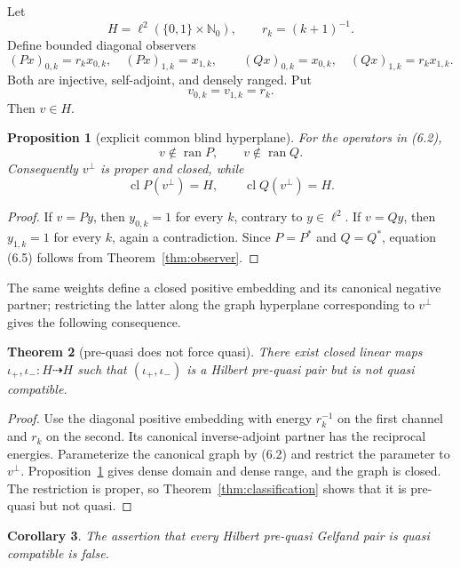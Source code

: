 \documentclass[11pt]{article}
\newtheorem{theorem}{Theorem}[section]
\newtheorem{proposition}[theorem]{Proposition}
\newtheorem{corollary}[theorem]{Corollary}
\newcommand{\N}{\mathbb N_0}
\newcommand{\ran}{\operatorname{ran}}
\newcommand{\clos}{\operatorname{cl}}
\begin{document}
Let
\[
  H=\ell^2(\{0,1\}\times\N),\qquad r_k=(k+1)^{-1}.
  \tag{6.1}
\]
Define bounded diagonal observers
\[
  (Px)_{0,k}=r_kx_{0,k},\quad (Px)_{1,k}=x_{1,k},
  \qquad
  (Qx)_{0,k}=x_{0,k},\quad (Qx)_{1,k}=r_kx_{1,k}.
  \tag{6.2}
\]
Both are injective, self-adjoint, and densely ranged.  Put
\[
  v_{0,k}=v_{1,k}=r_k.
  \tag{6.3}
\]
Then \(v\in H\).

\begin{proposition}[explicit common blind hyperplane]\label{prop:model}
For the operators in (6.2),
\[
  v\notin\ran P,\qquad v\notin\ran Q.
  \tag{6.4}
\]
Consequently \(v^\perp\) is proper and closed, while
\[
  \clos{P(v^\perp)}=H,
  \qquad
  \clos{Q(v^\perp)}=H.
  \tag{6.5}
\]
\end{proposition}

\begin{proof}
If \(v=Py\), then \(y_{0,k}=1\) for every \(k\), contrary to
\(y\in\ell^2\).  If \(v=Qy\), then \(y_{1,k}=1\) for every \(k\), again a
contradiction.  Since \(P=P^*\) and \(Q=Q^*\), equation (6.5) follows from
Theorem~\ref{thm:observer}.
\end{proof}

The same weights define a closed positive embedding and its canonical
negative partner; restricting the latter along the graph hyperplane
corresponding to \(v^\perp\) gives the following consequence.

\begin{theorem}[pre-quasi does not force quasi]\label{thm:counterexample}
There exist closed linear maps
\(\iota_+,\iota_-:H\dashrightarrow H\) such that
\((\iota_+,\iota_-)\) is a Hilbert pre-quasi pair but is not quasi compatible.
\end{theorem}

\begin{proof}
Use the diagonal positive embedding with energy \(r_k^{-1}\) on the first
channel and \(r_k\) on the second.  Its canonical inverse-adjoint partner has
the reciprocal energies.  Parameterize the canonical graph by (6.2) and
restrict the parameter to \(v^\perp\).  Proposition~\ref{prop:model} gives
dense domain and dense range, and the graph is closed.  The restriction is
proper, so Theorem~\ref{thm:classification} shows that it is pre-quasi but
not quasi.
\end{proof}

\begin{corollary}\label{cor:conjectures}
The assertion that every Hilbert pre-quasi Gelfand pair is quasi compatible
is false.
\end{corollary}
\end{document}
